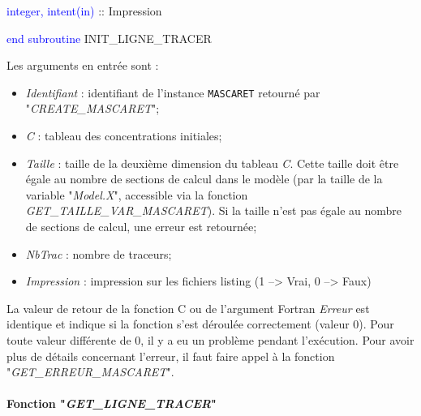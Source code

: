 \documentclass[a4paper,11pt]{article}
\begin{document}
        \hspace{1cm} \textcolor{blue}{integer, intent(in)}  :: Impression
        
    \textcolor{blue}{end subroutine} INIT\_LIGNE\_TRACER

 \vspace{0.5cm}
 
 Les arguments en entr\'ee sont :
 
 \vspace{0.5cm}
 
 \begin{itemize}
 
    \item \textit{Identifiant} : identifiant de l'instance \texttt{MASCARET} retourn\'e par "\textit{CREATE\_MASCARET}";
    \vspace{0.5cm}
    \item \textit{C} : tableau des concentrations initiales;
    \vspace{0.5cm}
    \item \textit{Taille} : taille de la deuxi\`eme dimension du tableau \textit{C}. Cette taille doit \^etre \'egale au nombre de sections de calcul dans le mod\`ele (par la taille de la variable "\textit{Model.X}", accessible via la fonction \textit{GET\_TAILLE\_VAR\_MASCARET}). Si la taille n'est pas \'egale au nombre de sections de calcul, une erreur est retourn\'ee;
    \vspace{0.5cm}
    \item \textit{NbTrac} : nombre de traceurs;
    \vspace{0.5cm}
    \item  \textit{Impression} : impression sur les fichiers listing (1 --> Vrai, 0 --> Faux)
 \end{itemize}

\vspace{0.5cm}
 
  La valeur de retour de la fonction C ou de l'argument Fortran
  \textit{Erreur} est identique et indique si la fonction s'est
  d\'eroul\'ee correctement (valeur 0). Pour toute valeur diff\'erente
  de 0, il y a eu un probl\`eme pendant l'ex\'ecution. Pour avoir plus
  de d\'etails concernant l'erreur, il faut faire appel \`a la
  fonction "\textit{GET\_ERREUR\_MASCARET}".

 \paragraph{Fonction "\textit{GET\_LIGNE\_TRACER}"\\}
\end{document}
